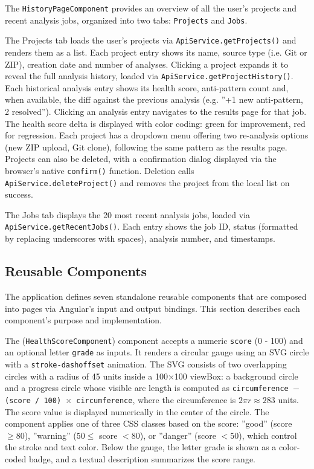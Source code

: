 The \texttt{HistoryPageComponent} provides an overview of all the user's projects and recent analysis jobs, organized into two tabs: \texttt{Projects} and \texttt{Jobs}.

The Projects tab loads the user's projects via \texttt{ApiService.getProjects()} and renders them as a list. Each project entry shows its name, source type (i.e. Git or ZIP), creation date and number of analyses. Clicking a project expands it to reveal the full analysis history, loaded via \texttt{ApiService.getProjectHistory()}. Each historical analysis entry shows its health score, anti-pattern count and, when available, the diff against the previous analysis (e.g. ''+1 new anti-pattern, 2 resolved''). Clicking an analysis entry navigates to the results page for that job. The health score delta is displayed with color coding: green for improvement, red for regression. Each project has a dropdown menu offering two re-analysis options (new ZIP upload, Git clone), following the same pattern as the results page. Projects can also be deleted, with a confirmation dialog displayed via the browser's native \texttt{confirm()} function. Deletion calls \texttt{ApiService.deleteProject()} and removes the project from the local list on success.

The Jobs tab displays the 20 most recent analysis jobs, loaded via \texttt{ApiSer\-vice.get\-Re\-cent\-Jobs()}. Each entry shows the job ID, status (formatted by replacing underscores with spaces), analysis number, and timestamps.

\subsection{Reusable Components}
\label{subsec:frontend-components}

\par The application defines seven standalone reusable components that are composed into pages via Angular's input and output bindings. This section describes each component's purpose and implementation.

\par The (\texttt{HealthScoreComponent}) component accepts a numeric \texttt{score} (0 - 100) and an optional letter \texttt{grade} as inputs. It renders a circular gauge using an SVG circle with a \texttt{stroke-dashoffset} animation. The SVG consists of two overlapping circles with a radius of 45 units inside a 100$\times$100 viewBox: a background circle and a progress circle whose visible arc length is computed as \texttt{circumference $-$ (score / 100) $\times$ circumference}, where the circumference is $2\pi r \approx 283$ units. The score value is displayed numerically in the center of the circle. The component applies one of three CSS classes based on the score: ''good'' (score $\geq 80$), ''warning'' ($50 \leq$ score $< 80$), or ''danger'' (score $< 50$), which control the stroke and text color. Below the gauge, the letter grade is shown as a color-coded badge, and a textual description summarizes the score range.

